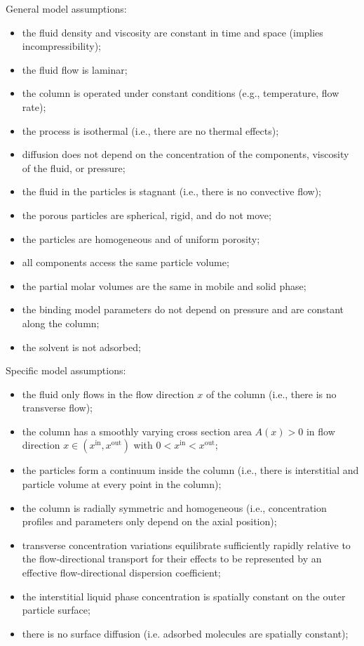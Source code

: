 \documentclass{article}
\begin{document}
General model assumptions:
\begin{itemize}
    \item the fluid density and viscosity are constant in time and space (implies incompressibility);
    \item the fluid flow is laminar;
    \item the column is operated under constant conditions (e.g., temperature, flow rate);
    \item the process is isothermal (i.e., there are no thermal effects);
    \item diffusion does not depend on the concentration of the components, viscosity of the fluid, or pressure;
    \item the fluid in the particles is stagnant (i.e., there is no convective flow);
    \item the porous particles are spherical, rigid, and do not move;
    \item the particles are homogeneous and of uniform porosity;
    \item all components access the same particle volume;
    \item the partial molar volumes are the same in mobile and solid phase;
    \item the binding model parameters do not depend on pressure and are constant along the column;
    \item the solvent is not adsorbed;
\end{itemize}

Specific model assumptions:
\begin{itemize}
    \item the fluid only flows in the flow direction $x$ of the column (i.e., there is no transverse flow);
    \item the column has a smoothly varying cross section area $A(x) > 0$ in flow direction $x \in (x^{\mathrm{in}}, x^{\mathrm{out}})$ with $0 < x^{\mathrm{in}} < x^{\mathrm{out}}$;
    \item the particles form a continuum inside the column (i.e., there is interstitial and particle volume at every point in the column);
    \item the column is radially symmetric and homogeneous (i.e., concentration profiles and parameters only depend on the axial position);
    \item transverse concentration variations equilibrate sufficiently rapidly relative to the flow-directional transport for their effects to be represented by an effective flow-directional dispersion coefficient;
    \item the interstitial liquid phase concentration is spatially constant on the outer particle surface;
    \item there is no surface diffusion (i.e. adsorbed molecules are spatially constant);
\end{itemize}
\end{document}
